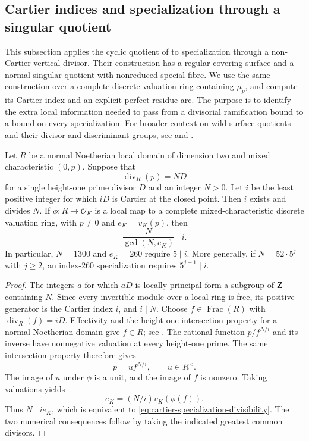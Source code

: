 \subsection{Cartier indices and specialization through a singular quotient}
\label{subsec:noncartier-specialization}

This subsection applies the cyclic quotient of
\citet[Example~5.10, pp.~24--25]{LiedtkeMatsumoto2018} to specialization through a
non-Cartier vertical divisor. Their construction has a regular covering
surface and a normal singular quotient with nonreduced special fibre.
We use the same construction over a complete discrete valuation ring
containing $\mu_p$, and compute its Cartier index and an explicit
perfect-residue arc. The purpose is to identify the extra local
information needed to pass from a divisorial ramification bound to a
bound on every specialization.
For broader context on wild surface quotients and their divisor and
discriminant groups, see \citet{Lorenzini2013WildQuotients} and
\citet{LorenziniSchroer2023WildQuotients}.

\begin{lemma}
\label{lem:cartier-index-contact}
Let $R$ be a normal Noetherian local domain of dimension two and mixed
characteristic $(0,p)$. Suppose that
\[
                   \operatorname{div}_R(p)=N D
\]
for a single height-one prime divisor $D$ and an integer $N>0$.
Let $i$ be the least positive integer for which $iD$ is Cartier at the
closed point. Then $i$ exists and divides $N$. If
$\phi:R\longrightarrow\mathcal O_K$ is a local map to a complete
mixed-characteristic discrete valuation ring, with $p\ne0$ and
$e_K=v_K(p)$, then
\begin{equation}
               \frac{N}{\gcd(N,e_K)}\mid i.
\label{eq:cartier-specialization-divisibility}
\end{equation}
In particular, $N=1300$ and $e_K=260$ require $5\mid i$.
More generally, if $N=52\cdot5^j$ with $j\ge2$, an index-$260$
specialization requires $5^{j-1}\mid i$.
\end{lemma}

\begin{proof}
The integers $a$ for which $aD$ is locally principal form a subgroup of
$\mathbf Z$ containing $N$. Since every invertible module over a local
ring is free, its positive generator is the Cartier index $i$, and
$i\mid N$.
Choose $f\in\operatorname{Frac}(R)$ with
$\operatorname{div}_R(f)=iD$. Effectivity and the height-one intersection
property for a normal Noetherian domain give $f\in R$; see
\cite[Lemma~10.157.6]{StacksHeightOneIntersection}.
The rational function $p/f^{N/i}$ and its inverse have nonnegative
valuation at every height-one prime. The same intersection property
therefore gives
\[
                      p=u f^{N/i},\qquad u\in R^\times.
\]
The image of $u$ under $\phi$ is a unit, and the image of $f$ is nonzero.
Taking valuations yields
\[
                      e_K=(N/i)v_K(\phi(f)).
\]
Thus $N\mid i e_K$, which is equivalent to
\eqref{eq:cartier-specialization-divisibility}.
The two numerical consequences follow by taking the indicated greatest
common divisors.
\end{proof}


